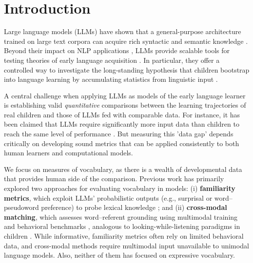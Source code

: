 \graphicspath{{ch2/papers/exp_vocab/}}
\providecommand{\meCDI}{\textsc{corpus-CDI}}



\section{Introduction}

Large language models (LLMs) have shown that a general-purpose architecture trained on large text corpora can acquire rich syntactic and semantic knowledge \citep{brown2020language, devlin2019bert, touvron2023llama}. Beyond their impact on NLP applications \citep{bommasani2021opportunities}, LLMs provide scalable tools for testing theories of early language acquisition \citep{dupoux2018cognitive, evanson2023language, lavechin2022reverse, apidianaki2024language, hu2025language}. In particular, they offer a controlled way to investigate the long-standing hypothesis that children bootstrap into language learning by accumulating statistics from linguistic input \citep{saffran1996statistical}.

A central challenge when applying LLMs as models of the early language learner is establishing valid \emph{quantitative} comparisons between the learning trajectories of real children and those of LLMs fed with comparable data. For instance, it has been claimed that LLMs require significantly more input data than children to reach the same level of performance \citep{frank2023bridging}. But measuring this 'data gap' depends critically on developing sound metrics that can be applied consistently to both human learners and computational models.  


We focus on measures of vocabulary, as there is a wealth of developmental data that provides human side of the comparison. Previous work has primarily explored two approaches for evaluating vocabulary in models: (i) \textbf{familiarity metrics}, which exploit LLMs' probabilistic outputs (e.g., surprisal or word–pseudoword preference) to probe lexical knowledge \citep{chang2022word, ma2025babysit, lavechin2025simulating}; and (ii) \textbf{cross-modal matching}, which assesses word–referent grounding using multimodal training and behavioral benchmarks \citep{vong2024grounded, tan2024devbench, nikolaus2021modeling}, analogous to looking-while-listening paradigms in children \citep{swingley2011looking}. While informative, familiarity metrics often rely on limited behavioral data, and cross-modal methods require multimodal input unavailable to unimodal language models. Also, neither of them has focused on expressive vocabulary. 



